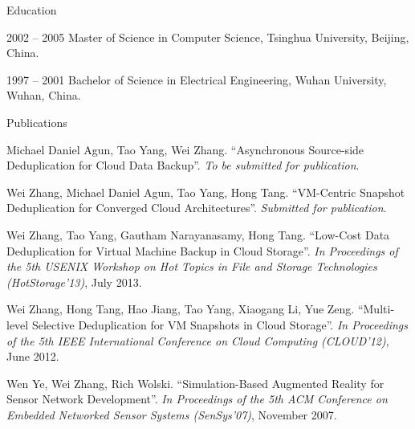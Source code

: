 \begin{vitae}
{\small

\begin{vitaesection}{Education}
\vspace{-0.1cm}
   \item [2002 -- 2005] Master of Science in Computer Science, Tsinghua University, Beijing, China.
    
   \item [1997 -- 2001] Bachelor of Science in Electrical Engineering, Wuhan University, Wuhan, China.

\end{vitaesection}



\begin{vitaesection}{Publications}
\item Michael Daniel Agun, Tao Yang, Wei Zhang. ``Asynchronous Source-side Deduplication for Cloud Data Backup''. {\it To be submitted for publication}.

\item Wei Zhang, Michael Daniel Agun, Tao Yang, Hong Tang. ``VM-Centric Snapshot Deduplication for Converged Cloud Architectures''. {\it Submitted for publication}.

\item Wei Zhang, Tao Yang, Gautham Narayanasamy, Hong Tang. ``Low-Cost Data Deduplication for Virtual Machine Backup in Cloud Storage''. {\it In Proceedings of the 5th USENIX Workshop on Hot Topics in File and Storage Technologies (HotStorage'13)}, July 2013.

\item Wei Zhang, Hong Tang, Hao Jiang, Tao Yang, Xiaogang Li, Yue Zeng. ``Multi-level Selective Deduplication for VM Snapshots in Cloud Storage''. {\it In Proceedings of the 5th IEEE International Conference on Cloud Computing (CLOUD'12)}, June 2012.

\item Wen Ye, Wei Zhang, Rich Wolski. ``Simulation-Based Augmented Reality for Sensor Network Development''. {\it In Proceedings of the 5th ACM Conference on Embedded Networked Sensor Systems (SenSys'07)}, November 2007.


\end{vitaesection}}
\end{vitae}

